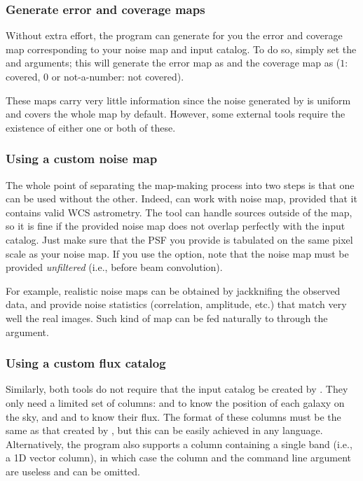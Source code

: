 \subsubsection{Generate error and coverage maps}

Without extra effort, the  program can generate for you the error and coverage map corresponding to your noise map and input catalog. To do so, simply set the  and  arguments; this will generate the error map as  and the coverage map as  ($1$: covered, $0$ or not-a-number: not covered).

These maps carry very little information since the noise generated by  is uniform and covers the whole map by default. However, some external tools require the existence of either one or both of these.


\subsubsection{Using a custom noise map}

The whole point of separating the map-making process into two steps is that one can be used without the other. Indeed,  can work with noise map, provided that it contains valid WCS astrometry. The tool can handle sources outside of the map, so it is fine if the provided noise map does not overlap perfectly with the input catalog. Just make sure that the PSF you provide is tabulated on the same pixel scale as your noise map. If you use the  option, note that the noise map must be provided \emph{unfiltered} (i.e., before beam convolution).

For example, realistic \herschel noise maps can be obtained by jackknifing the observed data, and provide noise statistics (correlation, amplitude, etc.) that match very well the real images. Such kind of map can be fed naturally to  through the  argument.


\subsubsection{Using a custom flux catalog}

Similarly, both tools do not require that the input catalog be created by . They only need a limited set of columns:  and  to know the position of each galaxy on the sky, and  and  to know their flux. The format of these columns must be the same as that created by , but this can be easily achieved in any language. Alternatively, the program also supports a  column containing a single band (i.e., a 1D vector column), in which case the  column and the  command line argument are useless and can be omitted.
